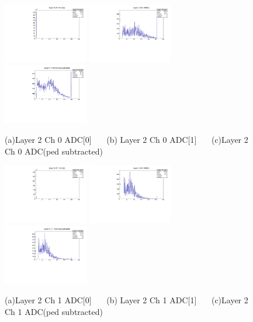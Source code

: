 \documentclass[a4paper,11pt]{article}
\theoremstyle{mytheor}
\begin{document}
\begin{figure}[H] 
\vspace*{-0.3cm} 
\includegraphics[width=0.33\textwidth,scale=0.5,trim=0 0 0 0,clip]{plotsdir/file0_test-Layer2_Ch0_adc0-1.pdf} 
\includegraphics[width=0.33\textwidth,scale=0.5,trim=0 0 0 0,clip]{plotsdir/file0_test-Layer2_Ch0_adc1-1.pdf} 
\includegraphics[width=0.33\textwidth,scale=0.5,trim=0 0 0 0,clip]{plotsdir/file0_test-Layer2_Ch0_adcPedsub-1.pdf} 
\caption{(a)Layer 2 Ch 0 ADC[0] ~~~(b) Layer 2 Ch 0 ADC[1] ~~~(c)Layer 2 Ch 0 ADC(ped subtracted) } 
\end{figure} 
\begin{figure}[H] 
\vspace*{-0.3cm} 
\includegraphics[width=0.33\textwidth,scale=0.5,trim=0 0 0 0,clip]{plotsdir/file0_test-Layer2_Ch1_adc0-1.pdf} 
\includegraphics[width=0.33\textwidth,scale=0.5,trim=0 0 0 0,clip]{plotsdir/file0_test-Layer2_Ch1_adc1-1.pdf} 
\includegraphics[width=0.33\textwidth,scale=0.5,trim=0 0 0 0,clip]{plotsdir/file0_test-Layer2_Ch1_adcPedsub-1.pdf} 
\caption{(a)Layer 2 Ch 1 ADC[0] ~~~(b) Layer 2 Ch 1 ADC[1] ~~~(c)Layer 2 Ch 1 ADC(ped subtracted) } 
\end{figure} 
\end{document}

